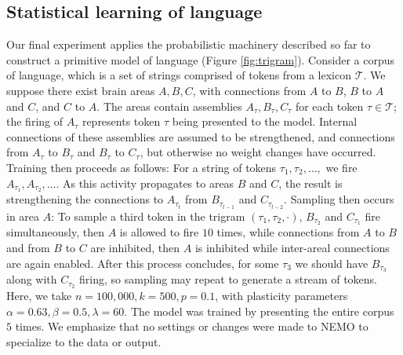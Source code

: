 \documentclass{article}
\theoremstyle{remark}
\newcommand{\1}{\mathbbm{1}}
\begin{document}
\subsection{Statistical learning of language}
Our final experiment applies the probabilistic machinery described so far to construct a primitive model of language (Figure \ref{fig:trigram}). Consider a corpus of language, which is a set of strings comprised of tokens from a lexicon $\mathcal T$. We suppose there exist brain areas $A, B, C$, with connections from $A$ to $B$, $B$ to $A$ and $C$, and $C$ to $A$. The areas contain assemblies $A_\tau, B_\tau, C_\tau$ for each token $\tau \in \mathcal T$; the firing of $A_\tau$ represents token $\tau$ being presented to the model. Internal connections of these assemblies are assumed to be strengthened, and connections from $A_\tau$ to $B_\tau$ and $B_\tau$ to $C_\tau$, but otherwise no weight changes have occurred. Training then proceeds as follows: For a string of tokens $\tau_1, \tau_2, \ldots,$ we fire $A_{\tau_1}, A_{\tau_2}, \ldots$. As this activity propagates to areas $B$ and $C$, the result is strengthening the connections to $A_{\tau_t}$ from $B_{\tau_{t-1}}$ and $C_{\tau_{t-2}}$. Sampling then occurs in area $A$: To sample a third token in the trigram $(\tau_1, \tau_2, \cdot)$, $B_{\tau_2}$ and $C_{\tau_1}$ fire simultaneously, then $A$ is allowed to fire $10$ times, while connections from $A$ to $B$ and from $B$ to $C$ are inhibited, then $A$ is inhibited while inter-areal connections are again enabled. After this process concludes, for some $\tau_3$ we should have $B_{\tau_3}$ along with $C_{\tau_2}$ firing, so sampling may repeat to generate a stream of tokens. Here, we take $n=100,000, k=500, p=0.1$, with plasticity parameters $\alpha=0.63, \beta=0.5, \lambda=60$. The model was trained by presenting the entire corpus $5$ times. We emphasize that no settings or changes were made to NEMO to specialize to the data or output. 
\end{document}
